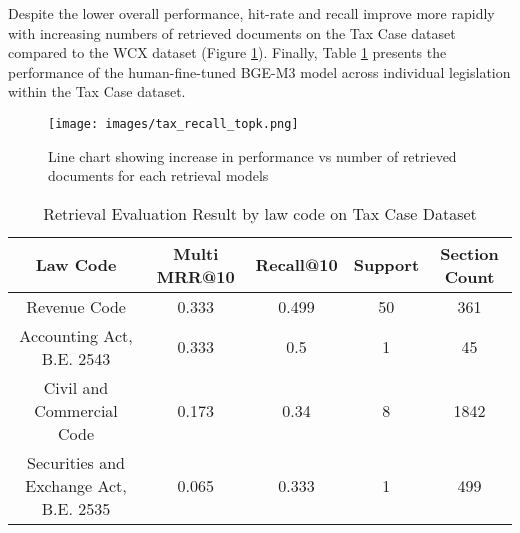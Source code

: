 Despite the lower overall performance, hit-rate and recall improve more rapidly with increasing numbers of retrieved documents on the Tax Case dataset compared to the WCX dataset (Figure \ref{fig: tax_mrr_vs_topk}). Finally, Table \ref{table: retrieval_tax_by_code} presents the performance of the human-fine-tuned BGE-M3 model across individual legislation within the Tax Case dataset.

\begin{figure}[ht]
  \centering
  \texttt{[image: images/tax\_recall\_topk.png]}
  \caption{Line chart showing increase in performance vs number of retrieved documents for each retrieval models}
  \label{fig: tax_mrr_vs_topk}
\end{figure}

\begin{table}[ht]
\centering
\caption{Retrieval Evaluation Result by law code on Tax Case Dataset}
\renewcommand{\arraystretch}{1.5} %
\label{table: retrieval_tax_by_code}
\begin{tabular}{@{}ccccc@{}}
\toprule
Law Code                               & Multi MRR@10 & Recall@10 & Support & Section Count \\ \midrule
Revenue Code                           & 0.333        & 0.499     & 50      & 361           \\
Accounting Act, B.E. 2543              & 0.333        & 0.5       & 1       & 45            \\
Civil and Commercial Code              & 0.173        & 0.34      & 8       & 1842          \\
Securities and Exchange Act, B.E. 2535 & 0.065        & 0.333     & 1       & 499           \\ \bottomrule
\end{tabular}
\end{table}

